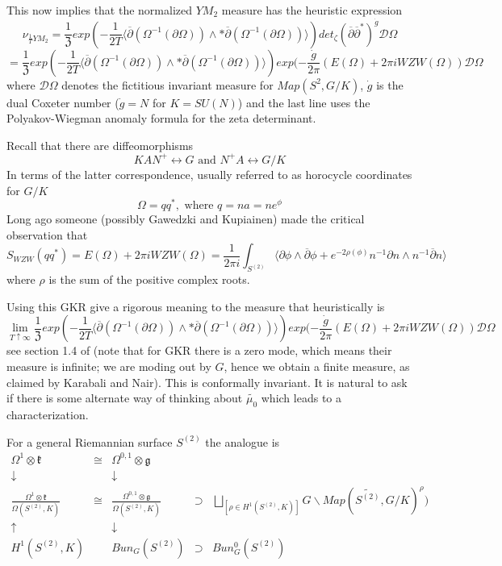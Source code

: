 \documentclass{amsart}
\theoremstyle{conjecture}
\theoremstyle{definition}
\theoremstyle{question}
\theoremstyle{questions}
\theoremstyle{remark}
\theoremstyle{remarks}
\theoremstyle{example}
\numberwithin{equation}{section}
\begin{document}
This now implies that the normalized $YM_2$ measure has the heuristic expression
$$\nu_{\frac 1T YM_2}=\frac{1}{\mathfrak Z}exp(-\frac{1}{2T}\langle\overline{\partial }
(\Omega^{-1}(\partial\Omega ))\wedge *\overline{\partial }(\Omega^{-1}
(\partial\Omega ))\rangle) det_{\zeta}(\overline{\partial }\overline{\partial }^*)^{\dot g} \mathcal D\Omega $$
$$=\frac{1}{\mathfrak Z}exp(-\frac{1}{2T}\langle\overline{\partial }
(\Omega^{-1}(\partial\Omega ))\wedge *\overline{\partial }(\Omega^{-1}
(\partial\Omega ))\rangle) exp(-\frac {\dot g}{2\pi}(
E(\Omega )+2\pi iWZW(\Omega ))\mathcal D\Omega $$
where $\mathcal D\Omega$ denotes the fictitious invariant measure for $Map(S^{2},G/K)$, $\dot g$ is the
dual Coxeter number ($\dot g=N$ for $K=SU(N)$) and
the last line uses the Polyakov-Wiegman anomaly formula for the zeta determinant. 

Recall that there are diffeomorphisms
$$ KAN^+ \leftrightarrow G \text{  and  } N^+A \leftrightarrow G/K$$
In terms of the latter correspondence, usually referred to as horocycle coordinates for $G/K$ 
$$\Omega=qq^*, \text{ where } q=na=ne^{\phi} $$
Long ago someone (possibly Gawedzki and Kupiainen) made the critical observation that
$$S_{WZW}(qq^*)=E(\Omega )+2\pi iWZW(\Omega )=\frac{1}{2\pi i}\int_{S^{(2)}}\langle \partial\phi\wedge \overline{\partial}\phi+e^{-2\rho(\phi)}  n^{-1}\partial n\wedge n^{-1}\overline{\partial}n\rangle $$
where $\rho$ is the sum of the positive complex roots. 

Using this GKR give a rigorous meaning to the measure that heuristically is
$$\lim_{T\uparrow \infty}\frac{1}{\mathfrak Z}exp(-\frac{1}{2T}\langle\overline{\partial }
(\Omega^{-1}(\partial\Omega ))\wedge *\overline{\partial }(\Omega^{-1}
(\partial\Omega ))\rangle) exp(-\frac {\dot g}{2\pi}(
E(\Omega )+2\pi iWZW(\Omega ))\mathcal D\Omega $$
see section 1.4 of \cite{GKR} (note that for GKR there is a zero mode, which means their measure is infinite; we are moding out
 by $G$, hence we obtain a finite measure, as claimed by Karabali and Nair). This is conformally invariant. It is natural to ask if there is some alternate
 way of thinking about $\widetilde{\mu_0}$ which leads to a characterization.

For a general Riemannian surface $S^{(2)}$ the analogue is 
$$\begin{matrix} \Omega^1\otimes \mathfrak k &\cong & \Omega^{0,1}\otimes \mathfrak g & & \\
\downarrow & &\downarrow & & \\
\frac{\Omega^1\otimes \mathfrak k}{\Omega(S^{(2)},K)} & \cong&  \frac{\Omega^{0,1}\otimes \mathfrak g}{\Omega(S^{(2)},K)} & \supset &  \bigsqcup_{[\rho\in H^1(S^{(2)},K)]} G\backslash Map(\widetilde{S^{(2)}},G/K)^{\rho}) \\ 
\uparrow & &\downarrow & & \\ 
H^1(S^{(2)},K) & &  Bun_G(S^{(2)}) &\supset & Bun_G^0(S^{(2)}) \end{matrix} $$
\end{document}
